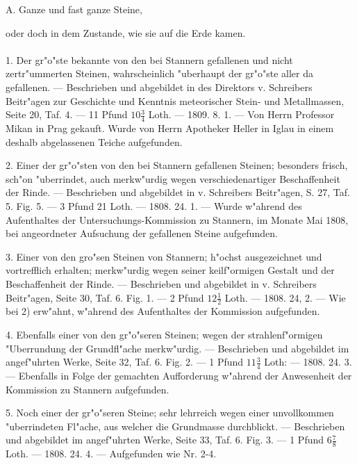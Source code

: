 \documentclass[a4paper, 11pt, oneside, polutonikogreek, german]{article}
\begin{document}
\setlength{\leftskip}{0pt}
\setlength{\parindent}{20pt}

\begin{center}
A. Ganze und fast ganze Steine,
\end{center}
oder doch in dem Zustande, wie sie auf die Erde kamen.
\paragraph{}
1. Der gr"o"ste bekannte von den bei Stannern gefallenen und nicht zertr"ummerten Steinen, wahrscheinlich "uberhaupt der gr"o"ste aller da gefallenen. --- Beschrieben und abgebildet in des Direktors v. Schreibers Beitr"agen zur Geschichte und Kenntnis meteorischer Stein- und Metallmassen, Seite 20, Taf. 4. --- 11 Pfund $\mathfrak{10\frac{3}{4}}$ Loth. --- 1809. 8. 1. --- Von Herrn Professor Mikan in Prag gekauft. Wurde von Herrn Apotheker Heller in Iglau in einem deshalb abgelassenen Teiche aufgefunden.

2. Einer der gr"o"sten von den bei Stannern gefallenen Steinen; besonders frisch, sch"on "uberrindet, auch merkw"urdig wegen verschiedenartiger Beschaffenheit der Rinde. --- Beschrieben und abgebildet in v. Schreibers Beitr"agen, S. 27, Taf. 5. Fig. 5. --- 3 Pfund 21 Loth. --- 1808. 24. 1. --- Wurde w"ahrend des Aufenthaltes der Untersuchungs-Kommission zu Stannern, im Monate Mai 1808, bei angeordneter Aufsuchung der gefallenen Steine aufgefunden.

3. Einer von den gro"sen Steinen von Stannern; h"ochst ausgezeichnet und vortrefflich erhalten; merkw"urdig wegen seiner keilf"ormigen Gestalt und der Beschaffenheit der Rinde. --- Beschrieben und abgebildet in v. Schreibers Beitr"agen, Seite 30, Taf. 6. Fig. 1. --- 2 Pfund $\mathfrak{12\frac{1}{2}}$ Loth. --- 1808. 24, 2. --- Wie bei 2) erw"ahnt, w"ahrend des Aufenthaltes der Kommission aufgefunden.

4. Ebenfalls einer von den gr"o"seren Steinen; wegen der strahlenf"ormigen "Uberrundung der Grundfl"ache merkw"urdig. --- Beschrieben und abgebildet im angef"uhrten Werke, Seite 32, Taf. 6. Fig. 2. --- 1 Pfund $\mathfrak{11\frac{3}{4}}$ Loth: --- 1808. 24. 3. --- Ebenfalls in Folge der gemachten Aufforderung w"ahrend der Anwesenheit der Kommission zu Stannern aufgefunden.

5. Noch einer der gr"o"seren Steine; sehr lehrreich wegen einer unvollkommen "uberrindeten Fl"ache, aus welcher die Grundmasse durchblickt. --- Beschrieben und abgebildet im angef"uhrten Werke, Seite 33, Taf. 6. Fig. 3. --- 1 Pfund $\mathfrak{6\frac{7}{8}}$ Loth. --- 1808. 24. 4. --- Aufgefunden wie Nr. 2-4.
\end{document}
